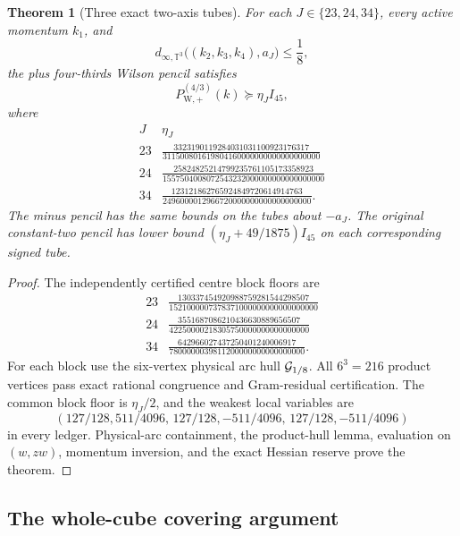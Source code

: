 \documentclass[11pt,oneside]{article}
\newtheorem{theorem}{Theorem}[section]
\theoremstyle{definition}
\theoremstyle{remark}
\begin{document}
\begin{theorem}[Three exact two-axis tubes]
\label{thm:newv34-two-axis}
For each \(J\in\{23,24,34\}\), every active momentum \(k_1\), and
\[
 d_{\infty,\mathbb T^3}
 \bigl((k_2,k_3,k_4),a_J\bigr)\le\frac18,               \tag{34.3}
\]
the plus four-thirds Wilson pencil satisfies
\[
 P_{\mathrm W,+}^{(4/3)}(k)\succeq\eta_JI_{45},        \tag{34.4}
\]
where
\[
\begin{array}{c|c}
J&\eta_J\\ \hline
23&
\displaystyle
\frac{3323190119284031031100923176317}
{311500801619804160000000000000000000}\\[6pt]
24&
\displaystyle
\frac{25824825214799235761105173358923}
{1557504008072543232000000000000000000}\\[6pt]
34&
\displaystyle
\frac{123121862765924849720614914763}
{2496000012966720000000000000000000}.
\end{array}                                             \tag{34.5}
\]
The minus pencil has the same bounds on the tubes about \(-a_J\).
The original constant-two pencil has lower bound
\((\eta_J+49/1875)I_{45}\) on each corresponding signed tube.
\end{theorem}

\begin{proof}
The independently certified centre block floors are
\[
\begin{array}{c|c}
23&\displaystyle
\frac{130337454920988759281544298507}
{1521000007378371000000000000000000}\\[5pt]
24&\displaystyle
\frac{3551687086210436630889656507}
{42250000218305750000000000000000}\\[5pt]
34&\displaystyle
\frac{642966027437250401240006917}
{7800000039811200000000000000000}.
\end{array}                                             \tag{34.6}
\]
For each block use the six-vertex physical arc hull
\({\cal G}_{1/8}\).  All \(6^3=216\) product vertices pass exact
rational congruence and Gram-residual certification.  The common
block floor is \(\eta_J/2\), and the weakest local variables are
\[
 (127/128,511/4096,\,
  127/128,-511/4096,\,
  127/128,-511/4096)                                   \tag{34.7}
\]
in every ledger.  Physical-arc containment, the product-hull lemma,
evaluation on \((w,zw)\), momentum inversion, and the exact Hessian
reserve prove the theorem.
\end{proof}

\subsection{The whole-cube covering argument}
\end{document}
